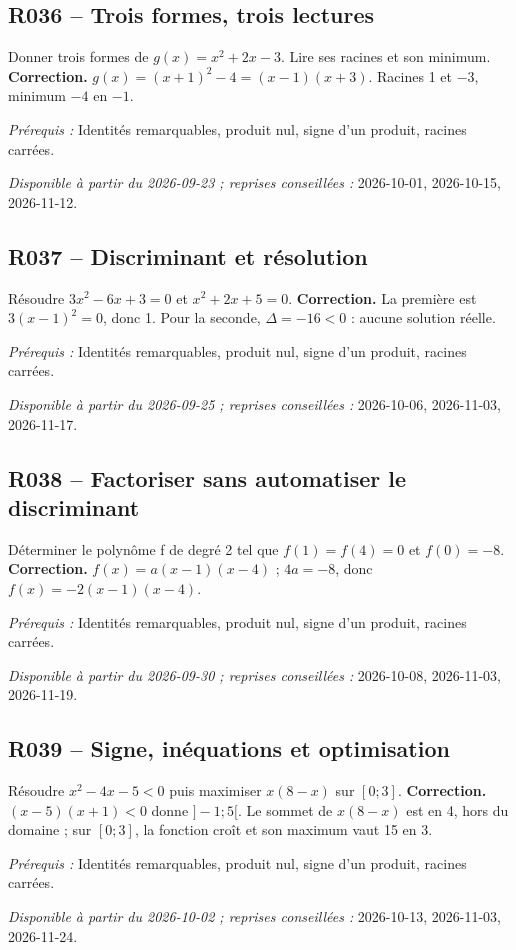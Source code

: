 \subsection*{R036 -- Trois formes, trois lectures}\label{R036}
Donner trois formes de $g(x)=x^2+2x-3$. Lire ses racines et son minimum.
\ifprof\textbf{Correction.} $g(x)=(x+1)^2-4=(x-1)(x+3)$. Racines 1 et $-3$, minimum $-4$ en $-1$.\par\textit{Prérequis :} Identités remarquables, produit nul, signe d’un produit, racines carrées.\par\textit{Disponible à partir du 2026-09-23 ; reprises conseillées :} 2026-10-01, 2026-10-15, 2026-11-12.\fi
{}\subsection*{R037 -- Discriminant et résolution}\label{R037}
Résoudre $3x^2-6x+3=0$ et $x^2+2x+5=0$.
\ifprof\textbf{Correction.} La première est $3(x-1)^2=0$, donc 1. Pour la seconde, $\Delta=-16<0$ : aucune solution réelle.\par\textit{Prérequis :} Identités remarquables, produit nul, signe d’un produit, racines carrées.\par\textit{Disponible à partir du 2026-09-25 ; reprises conseillées :} 2026-10-06, 2026-11-03, 2026-11-17.\fi
{}\subsection*{R038 -- Factoriser sans automatiser le discriminant}\label{R038}
Déterminer le polynôme f de degré 2 tel que $f(1)=f(4)=0$ et $f(0)=-8$.
\ifprof\textbf{Correction.} $f(x)=a(x-1)(x-4)$ ; $4a=-8$, donc $f(x)=-2(x-1)(x-4)$.\par\textit{Prérequis :} Identités remarquables, produit nul, signe d’un produit, racines carrées.\par\textit{Disponible à partir du 2026-09-30 ; reprises conseillées :} 2026-10-08, 2026-11-03, 2026-11-19.\fi
{}\subsection*{R039 -- Signe, inéquations et optimisation}\label{R039}
Résoudre $x^2-4x-5<0$ puis maximiser $x(8-x)$ sur $[0;3]$.
\ifprof\textbf{Correction.} $(x-5)(x+1)<0$ donne $]-1;5[$. Le sommet de $x(8-x)$ est en 4, hors du domaine ; sur $[0;3]$, la fonction croît et son maximum vaut 15 en 3.\par\textit{Prérequis :} Identités remarquables, produit nul, signe d’un produit, racines carrées.\par\textit{Disponible à partir du 2026-10-02 ; reprises conseillées :} 2026-10-13, 2026-11-03, 2026-11-24.\fi
